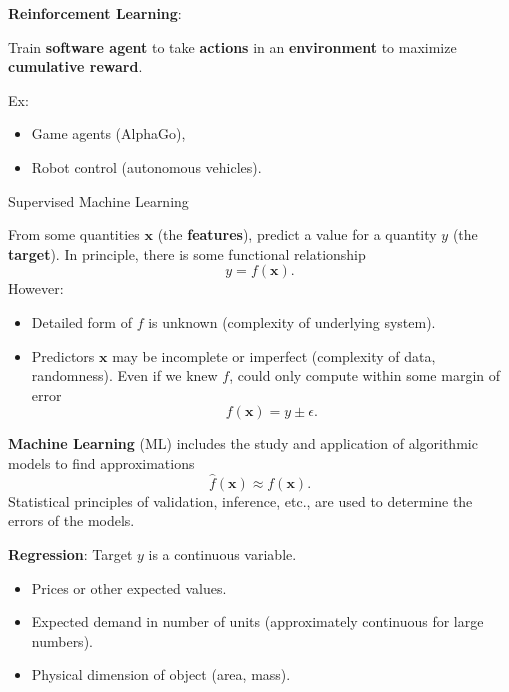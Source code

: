 \documentclass[12pt,t]{beamer}
\begin{document}
\begin{frame}

{\bf Reinforcement Learning}: 
\bigskip

Train {\bf software agent} to take {\bf actions} in an {\bf environment} to maximize {\bf cumulative reward}.  
\bigskip

Ex:

\begin{itemize}
\item Game agents (AlphaGo),
\item Robot control (autonomous vehicles).
\end{itemize}
\end{frame}

\begin{frame}{Supervised Machine Learning}

From some quantities $\mathbf{x}$ (the {\bf features}), predict a value for a quantity $y$ (the {\bf target}).   In principle, there is some functional relationship
$$ y = f(\mathbf{x}).$$
However:
\begin{itemize}
\item Detailed form of $f$ is unknown (complexity of underlying system).
\item Predictors $\mathbf{x}$ may be incomplete or imperfect (complexity of data, randomness). Even if we knew $f$,  could only compute within some margin of error
$$ f(\mathbf{x}) = y \pm \epsilon.$$
\end{itemize}

\end{frame}

\begin{frame}

{\bf Machine Learning} (ML)  includes the study and application of algorithmic models to find approximations  
$$ \hat{f}(\mathbf{x} )\approx f(\mathbf{x}). $$
Statistical principles of validation, inference, etc., are used to determine the errors of the models.


\bigskip

{\bf Regression}: Target $y$ is a continuous variable.
\begin{itemize}
\item Prices or other expected values. 
\item Expected demand in number of units  (approximately continuous for large numbers).
\item Physical dimension of object (area, mass).
\end{itemize}

\end{frame}
\end{document}
